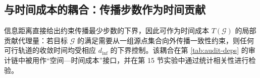 \subsection{与时间成本的耦合：传播步数作为时间贡献}

信息距离直接给出约束传播最少步数的下界，因此可作为时间成本 $T(\mathcal G)$ 的局部贡献代理量：若目标 $\mathcal G$ 的满足需要从一组源点集合向外传播一致性约束，则任何可行轨道的收敛时间均受相应 $d_{\mathrm{inf}}$ 的下界控制。该耦合在第 \ref{tab:audit-deps} 的审计链中被用作“空间—时间成本”接口，并在第 15 节实验中通过统计相关性进行检验。
